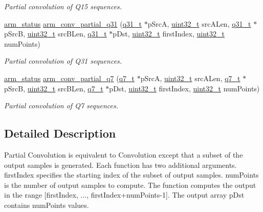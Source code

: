 \begin{DoxyCompactItemize}
\begin{DoxyCompactList}\small\item\em Partial convolution of Q15 sequences. \end{DoxyCompactList}\item 
\hyperlink{arm__math_8h_a5e459c6409dfcd2927bb8a57491d7cf6}{arm\-\_\-status} \hyperlink{group___partial_conv_ga78e73a5f02d103168a09821fb461e77a}{arm\-\_\-conv\-\_\-partial\-\_\-q31} (\hyperlink{arm__math_8h_adc89a3547f5324b7b3b95adec3806bc0}{q31\-\_\-t} $\ast$p\-Src\-A, \hyperlink{stdint_8h_a435d1572bf3f880d55459d9805097f62}{uint32\-\_\-t} src\-A\-Len, \hyperlink{arm__math_8h_adc89a3547f5324b7b3b95adec3806bc0}{q31\-\_\-t} $\ast$p\-Src\-B, \hyperlink{stdint_8h_a435d1572bf3f880d55459d9805097f62}{uint32\-\_\-t} src\-B\-Len, \hyperlink{arm__math_8h_adc89a3547f5324b7b3b95adec3806bc0}{q31\-\_\-t} $\ast$p\-Dst, \hyperlink{stdint_8h_a435d1572bf3f880d55459d9805097f62}{uint32\-\_\-t} first\-Index, \hyperlink{stdint_8h_a435d1572bf3f880d55459d9805097f62}{uint32\-\_\-t} num\-Points)
\begin{DoxyCompactList}\small\item\em Partial convolution of Q31 sequences. \end{DoxyCompactList}\item 
\hyperlink{arm__math_8h_a5e459c6409dfcd2927bb8a57491d7cf6}{arm\-\_\-status} \hyperlink{group___partial_conv_ga8567259fe18396dd972242c41741ebf4}{arm\-\_\-conv\-\_\-partial\-\_\-q7} (\hyperlink{arm__math_8h_ae541b6f232c305361e9b416fc9eed263}{q7\-\_\-t} $\ast$p\-Src\-A, \hyperlink{stdint_8h_a435d1572bf3f880d55459d9805097f62}{uint32\-\_\-t} src\-A\-Len, \hyperlink{arm__math_8h_ae541b6f232c305361e9b416fc9eed263}{q7\-\_\-t} $\ast$p\-Src\-B, \hyperlink{stdint_8h_a435d1572bf3f880d55459d9805097f62}{uint32\-\_\-t} src\-B\-Len, \hyperlink{arm__math_8h_ae541b6f232c305361e9b416fc9eed263}{q7\-\_\-t} $\ast$p\-Dst, \hyperlink{stdint_8h_a435d1572bf3f880d55459d9805097f62}{uint32\-\_\-t} first\-Index, \hyperlink{stdint_8h_a435d1572bf3f880d55459d9805097f62}{uint32\-\_\-t} num\-Points)
\begin{DoxyCompactList}\small\item\em Partial convolution of Q7 sequences. \end{DoxyCompactList}\end{DoxyCompactItemize}


\subsection{Detailed Description}
Partial Convolution is equivalent to Convolution except that a subset of the output samples is generated. Each function has two additional arguments. {\ttfamily first\-Index} specifies the starting index of the subset of output samples. {\ttfamily num\-Points} is the number of output samples to compute. The function computes the output in the range {\ttfamily \mbox{[}first\-Index, ..., first\-Index+num\-Points-\/1\mbox{]}}. The output array {\ttfamily p\-Dst} contains {\ttfamily num\-Points} values.

